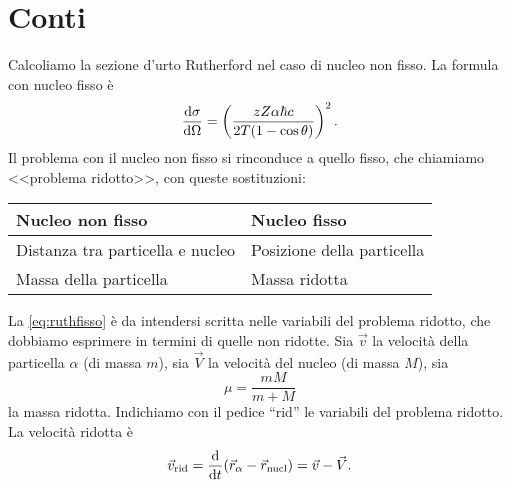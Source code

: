 \appendix
\section{Conti}
\label{sec:conti}

Calcoliamo la sezione d'urto Rutherford nel caso di nucleo non fisso.
La formula con nucleo fisso è
\begin{equation}
	\label{eq:ruthfisso}
	\frac{\mathrm{d} \sigma}{\mathrm{d} \Omega} = \left( \frac {zZ\alpha\hbar c} {2T(1-\cos\theta)} \right)^2.
\end{equation}
Il problema con il nucleo non fisso si rinconduce a quello fisso,
che chiamiamo <<problema ridotto>>, con queste sostituzioni:
\begin{center}
	\begin{tabular}{ll}
		Nucleo non fisso                 & Nucleo fisso               \\
		\hline
		Distanza tra particella e nucleo & Posizione della particella \\
		Massa della particella           & Massa ridotta              
	\end{tabular}
\end{center}
La \eqref{eq:ruthfisso} è da intendersi scritta nelle variabili del problema ridotto,
che dobbiamo esprimere in termini di quelle non ridotte.
Sia $\vec v$ la velocità della particella $\alpha$ (di massa $m$),
sia $\vec V$ la velocità del nucleo (di massa $M$), sia
\begin{equation*}
	\mu = \frac{mM}{m + M}
\end{equation*}
la massa ridotta.
Indichiamo con il pedice ``rid'' le variabili del problema ridotto.
La velocità ridotta è
\begin{equation*}
	\vec v_\text{rid} = \frac{\mathrm{d} }{\mathrm{d} t}(\vec r_\alpha - \vec r_\text{nucl}) = \vec v - \vec V.
\end{equation*}
